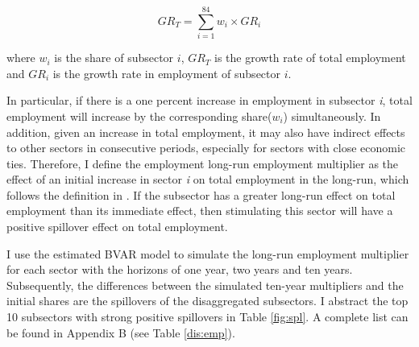 \documentclass{monashthesis}
\begin{document}
\[
GR_T=\sum_{i=1}^{84} w_i\times {GR}_i
\]

where \(w_i\) is the share of subsector \(i\), \(GR_T\) is the growth rate of total employment and \(GR_i\) is the growth rate in employment of subsector \(i\).

In particular, if there is a one percent increase in employment in subsector \emph{i}, total employment will increase by the corresponding share(\(w_i\)) simultaneously. In addition, given an increase in total employment, it may also have indirect effects to other sectors in consecutive periods, especially for sectors with close economic ties. Therefore, I define the employment long-run employment multiplier as the effect of an initial increase in sector \emph{i} on total employment in the long-run, which follows the definition in \textcite{anderson2020}. If the subsector has a greater long-run effect on total employment than its immediate effect, then stimulating this sector will have a positive spillover effect on total employment.

I use the estimated BVAR model to simulate the long-run employment multiplier for each sector with the horizons of one year, two years and ten years. Subsequently, the differences between the simulated ten-year multipliers and the initial shares are the spillovers of the disaggregated subsectors. I abstract the top 10 subsectors with strong positive spillovers in Table \ref{fig:spl}. A complete list can be found in Appendix B (see Table \ref{dis:emp}).
\end{document}
